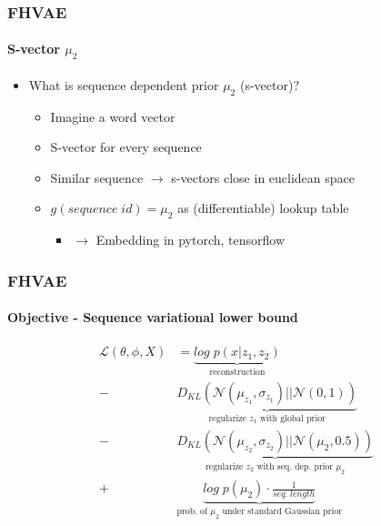 \documentclass[9pt]{beamer}
\begin{document}
\begin{frame}
\frametitle{FHVAE}
\framesubtitle{S-vector $\mu_2$}
\begin{itemize}
	\item What is sequence dependent prior $\mu_2$ (s-vector)?
	\begin{itemize}
		\item Imagine a word vector 
		\item S-vector for every sequence
		\item Similar sequence $\rightarrow$ s-vectors close in euclidean space
		\item $g(sequence\;id) = \mu_2$ as (differentiable) lookup table
		\begin{itemize}
			\item $\rightarrow$ Embedding in pytorch, tensorflow
		\end{itemize}
	\end{itemize}
\end{itemize}
\end{frame} 



\begin{frame}
\frametitle{FHVAE}
\framesubtitle{Objective - Sequence variational lower bound}
\begin{align*}
\mathcal{L}(\theta, \phi, X)& = %
\underbrace{log\;p(x|z_1, z_2)}_{\text{reconstruction}}\\%
-&\underbrace{D_{KL}(\mathcal{N}(\mu_{z_1}, \sigma_{z_1})||\mathcal{N}(0,1))}_{\text{regularize $z_1$ with global prior}}\\
-&\underbrace{D_{KL}(\mathcal{N}(\mu_{z_2}, \sigma_{z_2})||\mathcal{N}(\mu_2,0.5))}_{\text{regularize $z_2$ with seq. dep. prior $\mu_2$}}\\
+&\underbrace{log\;p(\mu_2) \cdot \frac{1}{seq.\;length}}_{\text{prob. of $\mu_2$ under standard Gaussian prior}}
\end{align*}
\end{frame} 
\end{document}
